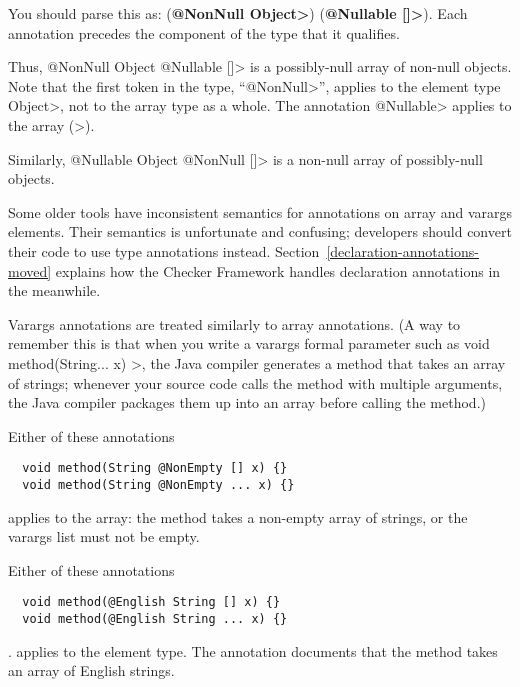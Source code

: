 
You should parse this as:
(\textbf{\<@NonNull Object>}) (\textbf{\<@Nullable []>}).
Each annotation precedes the component of the type that it qualifies.

Thus,
\<@NonNull Object @Nullable []> is a possibly-null array of non-null
objects.  Note that the first token in the type,
``\<@NonNull>'', applies to the element
type \<Object>, not to the array type as a whole.  The annotation \<@Nullable> applies to the
array (\<[]>).

Similarly,
\<@Nullable Object @NonNull []> is a non-null array of possibly-null
objects.

Some older tools have inconsistent semantics for annotations on array and
varargs elements.  Their semantics is unfortunate and confusing; developers
should convert their code to use type annotations instead.
Section~\ref{declaration-annotations-moved} explains how the Checker
Framework handles declaration annotations in the meanwhile.



Varargs annotations are treated similarly to array annotations.
(A way to remember this is that
when you write a varargs formal parameter such as
\<void method(String... x) \ttlcb\ttrcb>, the Java compiler generates a
method that takes an array of strings; whenever your source code calls the
method with multiple arguments, the Java compiler packages them up into an
array before calling the method.)

Either of these annotations

\begin{Verbatim}
  void method(String @NonEmpty [] x) {}
  void method(String @NonEmpty ... x) {}
\end{Verbatim}

\noindent
applies to the array:  the method takes a non-empty array of strings, or
the varargs list must not be empty.

Either of these annotations

\begin{Verbatim}
  void method(@English String [] x) {}
  void method(@English String ... x) {}
\end{Verbatim}

\noindent.
applies to the element type. The annotation documents that the method takes an array of English strings.


